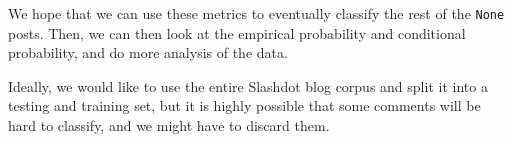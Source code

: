 \documentclass[a4paper,12pt]{article}
\numberwithin{equation}{section}
\begin{document}
We hope that we can use these metrics to eventually classify the rest of the {\tt None} posts. Then, we can then look at the empirical probability and conditional probability, and do more analysis of the data.

Ideally, we would like to use the entire Slashdot blog corpus and split it into a testing and training set, but it is highly possible that some comments will be hard to classify, and we might have to discard them.








\end{document}
